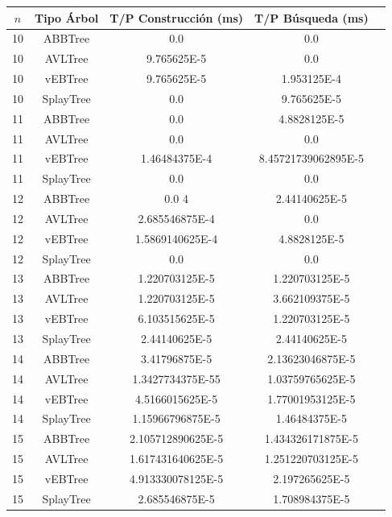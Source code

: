 \documentclass[letterpaper,12pt]{article}
\begin{document}
\begin{tabular}{|c|c|c|c|c|}
\hline
\textbf{$n$} & \textbf{Tipo Árbol} & \textbf{T/P Construcción (ms)} & \textbf{T/P Búsqueda (ms)} \\
\hline
10 & ABBTree & 0.0 & 0.0 \\
\hline
10 & AVLTree & 9.765625E-5 & 0.0 \\
\hline
10 & vEBTree & 9.765625E-5 & 1.953125E-4\\
\hline
10 & SplayTree & 0.0 & 9.765625E-5 \\
\hline
\hline
11 & ABBTree & 0.0 & 4.8828125E-5  \\
\hline
11 & AVLTree & 0.0 & 0.0 \\
\hline
11 & vEBTree & 1.46484375E-4 & 8.45721739062895E-5\\
\hline
11 & SplayTree & 0.0 & 0.0 \\
\hline
\hline
12 & ABBTree & 0.0 4 & 2.44140625E-5  \\
\hline
12 & AVLTree & 2.685546875E-4 & 0.0 \\
\hline
12 & vEBTree & 1.5869140625E-4 & 4.8828125E-5\\
\hline
12 & SplayTree & 0.0 & 0.0 \\
\hline
\hline
13 & ABBTree & 1.220703125E-5 & 1.220703125E-5  \\
\hline
13 & AVLTree & 1.220703125E-5 & 3.662109375E-5 \\
\hline
13 & vEBTree & 6.103515625E-5 & 1.220703125E-5\\
\hline
13 & SplayTree & 2.44140625E-5 & 2.44140625E-5 \\
\hline
\hline
14 & ABBTree & 3.41796875E-5 & 2.13623046875E-5 \\
\hline
14 & AVLTree & 1.3427734375E-55 & 1.03759765625E-5 \\
\hline
14 & vEBTree & 4.5166015625E-5 & 1.77001953125E-5\\
\hline
14 & SplayTree & 1.15966796875E-5 & 1.46484375E-5 \\
\hline
\hline
15 & ABBTree & 2.105712890625E-5 & 1.434326171875E-5 \\
\hline
15 & AVLTree & 1.617431640625E-5 & 1.251220703125E-5 \\
\hline
15 & vEBTree & 4.913330078125E-5  & 2.197265625E-5\\
\hline
15 & SplayTree & 2.685546875E-5 & 1.708984375E-5 \\
\hline
\end{tabular}
\end{document}
